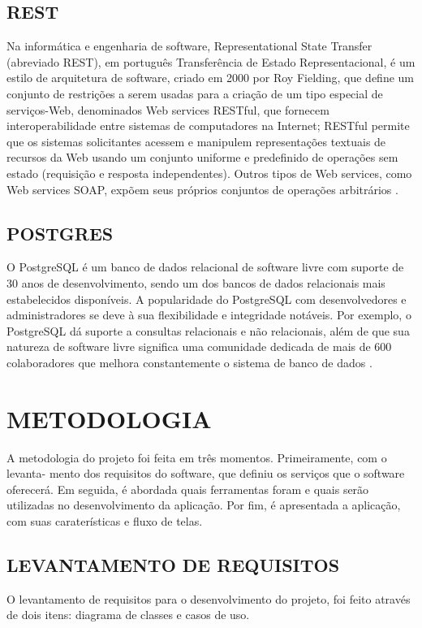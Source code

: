 \documentclass[a4paper,12pt]{article}
\begin{document}
\subsection{REST}
Na informática e engenharia de software, Representational State Transfer (abreviado REST), em português Transferência de Estado Representacional, é um estilo de arquitetura de software, criado em 2000 por Roy Fielding, que define um conjunto de restrições a serem usadas para a criação de um tipo especial de serviços-Web, denominados Web services RESTful, que fornecem interoperabilidade entre sistemas de computadores na Internet; RESTful permite que os sistemas solicitantes acessem e manipulem representações textuais de recursos da Web usando um conjunto uniforme e predefinido de operações sem estado (requisição e resposta independentes). Outros tipos de Web services, como Web services SOAP, expõem seus próprios conjuntos de operações arbitrários \cite{rest}.
\subsection{POSTGRES}
O PostgreSQL é um banco de dados relacional de software livre com suporte de 30 anos
de desenvolvimento, sendo um dos bancos de dados relacionais mais estabelecidos
disponíveis. A popularidade do PostgreSQL com desenvolvedores e administradores se
deve à sua flexibilidade e integridade notáveis. Por exemplo, o PostgreSQL dá
suporte a consultas relacionais e não relacionais, além de que sua natureza de
software livre significa uma comunidade dedicada de mais de 600 colaboradores
que melhora constantemente o sistema de banco de dados \cite{postgres}.

\section{METODOLOGIA}
\hspace{0.5cm}A metodologia do projeto foi feita em três momentos. Primeiramente, com o levanta-
mento dos requisitos do software, que definiu os serviços que o software oferecerá. Em seguida,
é abordada quais ferramentas foram e quais serão utilizadas no desenvolvimento da aplicação.
Por fim, é apresentada a aplicação, com suas caraterísticas e fluxo de telas.
\subsection{LEVANTAMENTO DE REQUISITOS}
\hspace{0.5cm}O levantamento de requisitos para o desenvolvimento do projeto, foi feito através de dois
itens: diagrama de classes e casos de uso.
\clearpage
\end{document}
